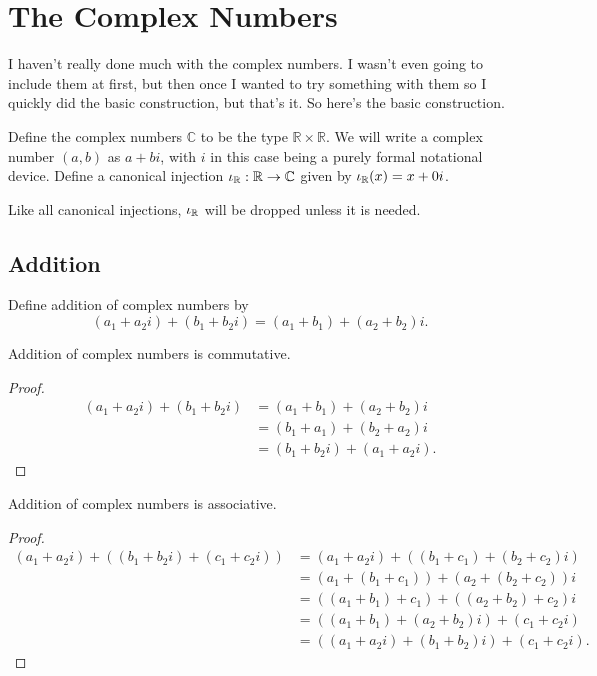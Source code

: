 \documentclass[../../math.tex]{subfiles}
\begin{document}
\setcounter{chapter}{11}

\chapter{The Complex Numbers}

I haven't really done much with the complex numbers.  I wasn't even going to
include them at first, but then once I wanted to try something with them so I
quickly did the basic construction, but that's it.  So here's the basic
construction.

\begin{definition}
    Define the complex numbers $\mathbb C$ to be the type $\mathbb R \times
    \mathbb R$.  We will write a complex number $(a, b)$ as $a + bi$, with $i$
    in this case being a purely formal notational device.  Define a canonical
    injection $\iota_{\mathbb{R}} : \mathbb R \to \mathbb C$ given by $\iota_{\mathbb{R}}(x) = x + 0i$.
\end{definition}

Like all canonical injections, $\iota_{\mathbb{R}}$ will be dropped unless it is needed.

\section{Addition}

\begin{instance}
    Define addition of complex numbers by
    \[
        (a_1 + a_2i) + (b_1 + b_2i) = (a_1 + b_1) + (a_2 + b_2)i.
    \]
\end{instance}

\begin{instance}
    Addition of complex numbers is commutative.
\end{instance}
\begin{proof}
    \begin{align*}
        (a_1 + a_2i) + (b_1 + b_2i)
        &= (a_1 + b_1) + (a_2 + b_2)i \\
        &= (b_1 + a_1) + (b_2 + a_2)i \\
        &= (b_1 + b_2i) + (a_1 + a_2i).
    \end{align*}
\end{proof}

\begin{instance}
    Addition of complex numbers is associative.
\end{instance}
\begin{proof}
    \begin{align*}
        (a_1 + a_2i) + ((b_1 + b_2i) + (c_1 + c_2i))
        &= (a_1 + a_2i) + ((b_1 + c_1) + (b_2 + c_2)i) \\
        &= (a_1 + (b_1 + c_1)) + (a_2 + (b_2 + c_2))i \\
        &= ((a_1 + b_1) + c_1) + ((a_2 + b_2) + c_2)i \\
        &= ((a_1 + b_1) + (a_2 + b_2)i) + (c_1 + c_2i) \\
        &= ((a_1 + a_2i) + (b_1 + b_2)i) + (c_1 + c_2i).
    \end{align*}
\end{proof}
\end{document}
